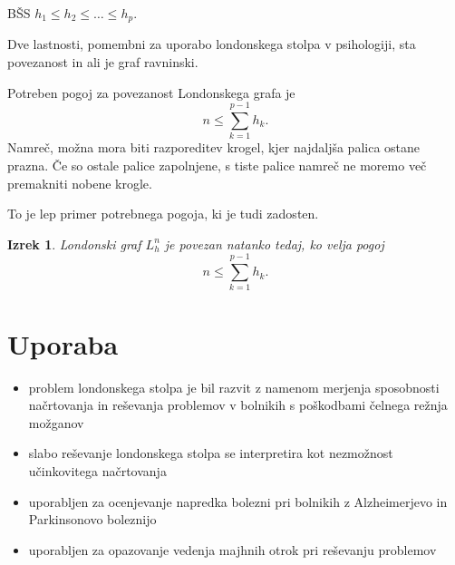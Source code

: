 \documentclass[11pt]{article}
\theoremstyle{definition} %
\theoremstyle{plain} %
\newtheorem{izrek}[definicija]{Izrek}
\begin{document}
BŠS $h_1 \leq h_2 \leq \ldots \leq h_p$.

Dve lastnosti, pomembni za uporabo londonskega stolpa v psihologiji, sta povezanost in ali je graf ravninski.

Potreben pogoj za povezanost Londonskega grafa je 
\[ n \leq \sum_{k=1}^{p-1} h_k. \]
Namreč, možna mora biti razporeditev krogel, kjer najdaljša palica ostane prazna. Če so ostale palice zapolnjene, s tiste palice namreč ne moremo več premakniti nobene krogle. 

To je lep primer potrebnega pogoja, ki je tudi zadosten.
\begin{izrek}
Londonski graf $L_h^n$ je povezan natanko tedaj, ko velja pogoj
\[ n \leq \sum_{k=1}^{p-1} h_k. \]
\end{izrek}


\section{Uporaba}
\begin{itemize}
    \item problem londonskega stolpa je bil razvit z namenom merjenja sposobnosti načrtovanja in reševanja problemov v bolnikih s poškodbami čelnega režnja možganov
    \item slabo reševanje londonskega stolpa se interpretira kot nezmožnost učinkovitega načrtovanja
    \item uporabljen za ocenjevanje napredka bolezni pri bolnikih z Alzheimerjevo in Parkinsonovo boleznijo
    \item uporabljen za opazovanje vedenja majhnih otrok pri reševanju problemov
\end{itemize}
\end{document}
